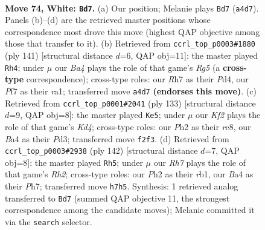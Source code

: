 \documentclass[11pt]{article}
\begin{document}
\clearpage

\begin{figure}[p]\centering
\begin{subfigure}{0.46\textwidth}\centering
\resizebox{\linewidth}{!}{%
\newchessgame
\chessboard[
  setfen={8/5P1R/8/8/Bk6/8/5K1P/8 w - - 1 74},
  showmover=false,
  pgfstyle=straightmove, color=movearrow, markmove={a4-d7}
]}
\caption{}
\end{subfigure}\hfill
\begin{subfigure}{0.46\textwidth}\centering
\resizebox{\linewidth}{!}{%
\newchessgame
\chessboard[
  setfen={8/8/6p1/1k6/3p2r1/5K2/8/R7 b - - 13 71},
  showmover=false,
  pgfstyle=straightmove, color=movearrow, markmove={g4-h4}
]}
\caption{}
\end{subfigure}
\\[4pt]
\begin{subfigure}{0.46\textwidth}\centering
\resizebox{\linewidth}{!}{%
\newchessgame
\chessboard[
  setfen={2R5/8/8/1p1k4/8/1r1pK3/8/8 b - - 5 67},
  showmover=false,
  pgfstyle=straightmove, color=movearrow, markmove={d5-e5}
]}
\caption{}
\end{subfigure}\hfill
\begin{subfigure}{0.46\textwidth}\centering
\resizebox{\linewidth}{!}{%
\newchessgame
\chessboard[
  setfen={7k/7P/8/8/8/3K4/5P1R/1r6 w - - 5 72},
  showmover=false,
  pgfstyle=straightmove, color=movearrow, markmove={h2-h5}
]}
\caption{}
\end{subfigure}
\caption{\textbf{Move 74, White: \texttt{Bd7}.} (a) Our position; Melanie plays \texttt{Bd7} (\texttt{a4d7}). Panels (b)--(d) are the retrieved master positions whose correspondence most drove this move (highest QAP objective among those that transfer to it). (b) Retrieved from \texttt{ccrl\_top\_p0003\#1880} (ply 141) [structural distance $d$=6, QAP obj=11]: the master played \texttt{Rh4}; under $\mu$ our \emph{Ba4} plays the role of that game's \emph{Rg5} (a \textbf{cross-type} correspondence); cross-type roles: our \emph{R}h7 as their \emph{P}d4, our \emph{P}f7 as their \emph{r}a1; transferred move \texttt{a4d7} \textbf{(endorses this move)}. (c) Retrieved from \texttt{ccrl\_top\_p0001\#2041} (ply 133) [structural distance $d$=9, QAP obj=8]: the master played \texttt{Ke5}; under $\mu$ our \emph{Kf2} plays the role of that game's \emph{Kd4}; cross-type roles: our \emph{P}h2 as their \emph{r}c8, our \emph{B}a4 as their \emph{P}d3; transferred move \texttt{f2f3}. (d) Retrieved from \texttt{ccrl\_top\_p0003\#2938} (ply 142) [structural distance $d$=7, QAP obj=8]: the master played \texttt{Rh5}; under $\mu$ our \emph{Rh7} plays the role of that game's \emph{Rh2}; cross-type roles: our \emph{P}h2 as their \emph{r}b1, our \emph{B}a4 as their \emph{P}h7; transferred move \texttt{h7h5}. Synthesis: 1 retrieved analog transferred to \texttt{Bd7} (summed QAP objective 11, the strongest correspondence among the candidate moves); Melanie committed it via the \texttt{search} selector.}
\label{fig:thought-m146}
\end{figure}
\end{document}
